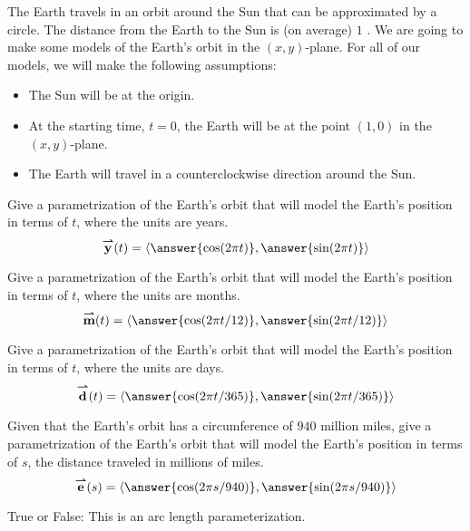\documentclass{ximera}
\author{Bart Snapp}
\begin{document}
\begin{exercise}
  The Earth travels in an orbit around the Sun that can be
  approximated by a circle. The distance from the Earth to the Sun is
  (on average) $1$
  . We are
  going to make some models of the Earth's orbit in the
  $(x,y)$-plane. For all of our models, we will make the following
  assumptions:
  \begin{itemize}
  \item The Sun will be at the origin.
  \item At the starting time, $t=0$, the Earth will be at the point
    $(1,0)$ in the $(x,y)$-plane.
  \item The Earth will travel in a counterclockwise direction around
    the Sun.
  \end{itemize}
  \begin{exercise}
    Give a parametrization of the Earth's orbit that will model the
    Earth's position in terms of $t$, where the units are years.
    \[
    \vec{y}(t) = \vector{\answer{\cos(2\pi t)},\answer{\sin(2\pi t)}} 
    \]
  \end{exercise}
  \begin{exercise}
    Give a parametrization of the Earth's orbit that will model the
    Earth's position in terms of $t$, where the units are months.
    \[
    \vec{m}(t) = \vector{\answer{\cos(2\pi t/12)},\answer{\sin(2\pi t/12)}} 
    \]
  \end{exercise}
  \begin{exercise}
    Give a parametrization of the Earth's orbit that will model the
    Earth's position in terms of $t$, where the units are days.
    \[
    \vec{d}(t) = \vector{\answer{\cos(2\pi t/365)},\answer{\sin(2\pi t/365)}} 
    \]
  \end{exercise}
  \begin{exercise}
    Given that the Earth's orbit has a circumference of $940$ million
    miles, give a parametrization of the Earth's orbit that will model
    the Earth's position in terms of $s$, the distance traveled in
    millions of miles.
    \[
    \vec{e}(s) = \vector{\answer{\cos(2\pi s/940)},\answer{\sin(2\pi s/940)}} 
    \]
    \begin{exercise}
      True or False: This is an arc length parameterization.
    \begin{multipleChoice}
    \end{multipleChoice}
    \begin{exercise}

\end{exercise}
\end{exercise}
\end{exercise}
\end{exercise}
\end{document}
